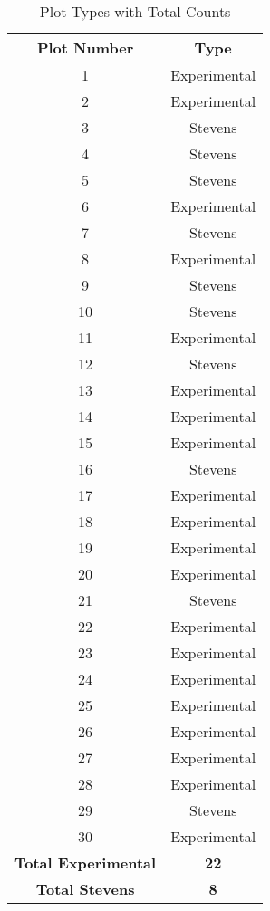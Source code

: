\begin{table}[!ht]
\centering
\begin{tabular}{cc}
\toprule
\textbf{Plot Number} & \textbf{Type} \\
\midrule
1 & Experimental \\
2 & Experimental \\
3 & Stevens \\
4 & Stevens \\
5 & Stevens \\
6 & Experimental \\
7 & Stevens \\
8 & Experimental \\
9 & Stevens \\
10 & Stevens \\
11 & Experimental \\
12 & Stevens \\
13 & Experimental \\
14 & Experimental \\
15 & Experimental \\
16 & Stevens \\
17 & Experimental \\
18 & Experimental \\
19 & Experimental \\
20 & Experimental \\
21 & Stevens \\
22 & Experimental \\
23 & Experimental \\
24 & Experimental \\
25 & Experimental \\
26 & Experimental \\
27 & Experimental \\
28 & Experimental \\
29 & Stevens \\
30 & Experimental \\
\midrule
\textbf{Total Experimental} & \textbf{22} \\
\textbf{Total Stevens} & \textbf{8} \\
\bottomrule
\end{tabular}
\caption{Plot Types with Total Counts}
\label{tab:plot type totals}
\end{table}
